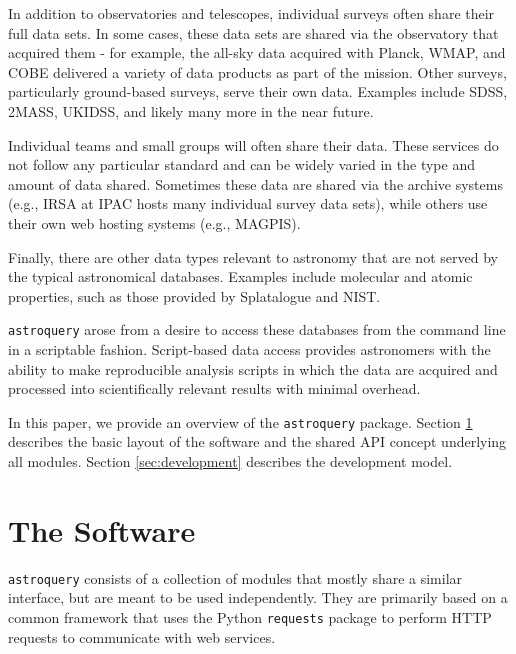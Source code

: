\documentclass[twocolumn]{aastex61}
\newcommand{\package}[1]{\texttt{#1}\xspace}
\newcommand{\astroquery}{\package{astroquery}}
\begin{document}
In addition to observatories and telescopes, individual surveys often share
their full data sets.  In some cases, these data sets are shared via the
observatory that acquired them - for example, the all-sky data acquired with
Planck, WMAP, and COBE delivered a variety of data products as part of the
mission.  Other surveys, particularly ground-based surveys, serve their own
data.  Examples include SDSS, 2MASS, UKIDSS, and likely many more in the near future.

Individual teams and small groups will often share their data.
These services do not follow any particular standard and can be widely
varied in the type and amount of data shared.  Sometimes these data
are shared via the archive systems (e.g., IRSA at IPAC hosts many
individual survey data sets), while others use their own web hosting
systems (e.g., MAGPIS).

Finally, there are other data types relevant to astronomy that are not
served by the typical astronomical databases.  Examples include molecular
and atomic properties, such as those provided by Splatalogue and NIST.

\astroquery arose from a desire to access these databases from the command line
in a scriptable fashion.  Script-based data access provides astronomers with
the ability to make reproducible analysis scripts in which the data are
acquired and processed into scientifically relevant results with minimal
overhead.

In this paper, we provide an overview of the \astroquery package.
Section \ref{sec:software} describes the basic layout of the software and
the shared API concept underlying all modules.  Section \ref{sec:development}
describes the development model.



\section{The Software}
\label{sec:software}
\astroquery consists of a collection of modules that mostly share a similar
interface, but are meant to be used independently.  They are primarily based on
a common framework that uses the Python \package{requests} package to perform
HTTP requests to communicate with web services.
\end{document}
